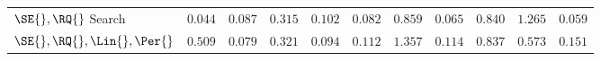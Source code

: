 \begin{table}[h]
{\begin{center}
\begin{tabularx}{\textwidth}{l | XXXXX | XXXXX}
\hline
$\SE{}, \RQ{}$ Search
& $\mathbf{0.044}$ & $\mathbf{0.087}$ & $\mathbf{0.315}$ & $\mathbf{0.102}$ & $\mathbf{0.082}$
& $\mathbf{0.859}$ & $\mathbf{0.065}$ & $\mathbf{0.840}$ & $1.265$ & $\mathbf{0.059}$ \\
$\SE{}, \RQ{}, \Lin{}, \Per{}$
& $\mathbf{0.509}$ & $\mathbf{0.079}$ & $\mathbf{0.321}$ & $\mathbf{0.094}$ & $\mathbf{0.112}$
& $\mathbf{1.357}$ & $\mathbf{0.114}$ & $\mathbf{0.837}$ & $\mathbf{0.573}$ & $\mathbf{0.151}$ \\
\end{tabularx}
\end{center}
}
\end{table}
%

\fi


